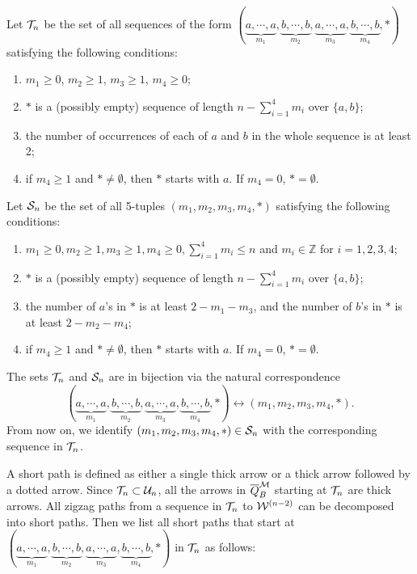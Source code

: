 \documentclass[10pt, reqno]{amsart}
\theoremstyle{definition}
\theoremstyle{remark}
\numberwithin{equation}{section}
\begin{document}
Let \(\mathcal{T}_n\) be the set of all sequences of the form \((\underbrace{a, \cdots,a}_{m_1}, \underbrace{b, \cdots,b}_{m_2}, \underbrace{a, \cdots,a}_{m_3}, \underbrace{b, \cdots,b}_{m_4},*)\) satisfying the following conditions:
\begin{enumerate}
    \item  \(m_1 \ge 0\), $m_2 \ge 1$, $m_3 \ge 1$, $m_4 \ge 0$;
    \item $*$ is a (possibly empty) sequence of length $n-\sum_{i=1}^4m_i$ over $\{a,b\}$;
    \item the number of occurrences of each of \(a\) and \(b\) in the whole sequence is at least 2;
    \item if $m_4 \ge 1$ and $*\neq \emptyset$, then \(*\)  starts with \(a\). If $m_4 = 0$, $*=\emptyset$.
\end{enumerate}

Let \(\mathcal{S}_n\) be the set of all 5-tuples \((m_1, m_2, m_3, m_4, *)\) satisfying the following conditions:
\begin{enumerate}
    \item  \(m_1 \ge 0, m_2 \ge 1, m_3 \ge 1, m_4 \ge 0, \sum_{i=1}^4m_i \le n\) and \(m_i \in \mathbb{Z}\) for \(i=1,2,3,4\);
    \item  $*$ is a (possibly empty) sequence of length $n-\sum_{i=1}^4m_i$ over $\{a,b\}$;
    \item the number of \(a\)'s in \(*\) is at least \(2-m_1-m_3\), and the number of \(b\)'s in \(*\) is at least  \(2 - m_2 -m_4\);
    \item if $m_4 \ge 1$ and $*\neq \emptyset$, then \(*\)  starts with \(a\). If $m_4 = 0$, $*=\emptyset$.
\end{enumerate} 
The sets \(\mathcal{T}_n\) and \(\mathcal{S}_n\) are in bijection via the natural correspondence
\[(\underbrace{a, \cdots,a}_{m_1}, \underbrace{b, \cdots,b}_{m_2}, \underbrace{a, \cdots,a}_{m_3}, \underbrace{b, \cdots,b}_{m_4},*) \longleftrightarrow (m_1, m_2, m_3, m_4, *).\]
From now on, we identify \((m_1, m_2, m_3, m_4, *)\in \mathcal{S}_n\) with the corresponding sequence in \(\mathcal{T}_n\).

A short path is defined as either a single thick arrow or a thick arrow followed by a dotted arrow.  
Since $\mathcal{T}_n \subset \mathcal{U}_n$, all the arrows in $\overline{Q}_B^{\mathcal{M}}$ starting at $\mathcal{T}_n$ are thick arrows. All zigzag paths from a sequence in $\mathcal{T}_n$ to $\mathcal{W}^{(n-2)}$ can be decomposed into short paths. Then we list all short paths that start at $(\underbrace{a, \cdots,a}_{m_1}, \underbrace{b, \cdots,b}_{m_2}, \underbrace{a, \cdots,a}_{m_3}, \underbrace{b, \cdots,b}_{m_4},*)$ in $\mathcal{T}_n$  as follows: 
\end{document}
